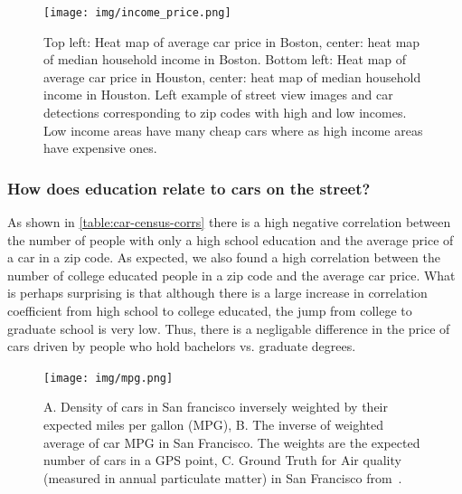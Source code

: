 \documentclass[10pt,twocolumn,letterpaper]{article}
\begin{document}
\begin{figure}[t]
\begin{center}
    \texttt{[image: img/income\_price.png]}
\end{center}
   \caption {Top left: Heat map of average car price in Boston, center: heat map of median household income in Boston. Bottom left: Heat map of average car price in Houston, center: heat map of median household income in Houston. Left example of street view images and car detections corresponding to zip codes with high and low incomes. Low income areas have many cheap cars where as high income areas have expensive ones.}
\label{fig:bos-sf-vis}
\end{figure}

\subsubsection{How does education relate to cars on the street?}
As shown in \ref{table:car-census-corrs} there is a high negative correlation between the number of people with only a high school education and the average price of a car in a zip code. As expected, we also found a high correlation between the number of college educated people in a zip code and the average car price. What is perhaps surprising is that although there is a large increase in correlation coefficient from high school to college educated, the jump from college to graduate school is very low. Thus, there is a negligable difference in the price of cars driven by people who hold bachelors vs. graduate degrees.

\begin{figure}[t]
\begin{center}
    \texttt{[image: img/mpg.png]}
\end{center}
   \caption {A. Density of cars in San francisco inversely weighted by their expected miles per gallon (MPG), B. The inverse of weighted average of car MPG in San Francisco. The weights are the expected number of cars in a GPS point, C. Ground Truth for Air quality (measured in annual particulate matter) in San Francisco from~\cite{ground_air}.}
\label{fig:pollution}
\end{figure}
\end{document}

